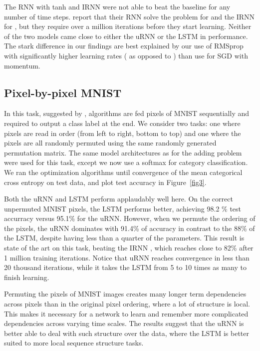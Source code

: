 \documentclass{article}
\begin{document}
The RNN with tanh and IRNN were not able to beat the baseline for any number of time steps. 
\cite{Quoc2015} report that their RNN solve the problem for  and the IRNN for ,
but they require over a million iterations before they start learning. 
Neither of the two models came close to either the uRNN or the LSTM in performance.
The stark difference in our findings are best explained by our use of RMSprop with significantly higher 
learning rates ( as opposed to ) than \cite{Quoc2015} use for SGD with momentum.

\vspace{-0.25mm}
\subsection{Pixel-by-pixel MNIST}

In this task, suggested by \cite{Quoc2015}, algorithms are fed pixels of MNIST \citep{MNIST} sequentially and required to output a 
class label at the end. We consider two tasks: one where pixels are read in order (from left to right,
bottom to top) and one where the pixels are all randomly permuted using the same randomly generated
permutation matrix. The same model architectures as for the adding problem were used for this task, except we now use a 
softmax for category classification. We ran the optimization algorithms until convergence of the 
mean categorical cross entropy on test data, and plot test accuracy in Figure~\ref{fig3}.

Both the uRNN and LSTM perform applaudably well here.
On the correct unpermuted MNIST pixels, the LSTM performs better, achieving 98.2 \% 
test accurracy versus 95.1\% for the uRNN. 
However, when we permute the ordering of the pixels, the uRNN dominates with 91.4\% of accuracy in 
contrast to the 88\% of the LSTM, despite having less than a quarter of the parameters. 
This result is state of the art on this task, beating the IRNN \citep{Quoc2015}, which reaches 
close to 82\% after 1 million training iterations. Notice that uRNN reaches convergence in less 
than 20 thousand iterations, while it takes the LSTM from 5 to 10 times as many to finish learning.

Permuting the pixels of MNIST images creates many longer term dependencies across pixels than in the 
original pixel ordering, where a lot of structure is local. This makes it necessary for a network to 
learn and remember more complicated dependencies across varying time scales. 
The results suggest that the uRNN is better able to deal with such structure over the data, where the 
LSTM is better suited to more local sequence structure tasks.  
\end{document}
